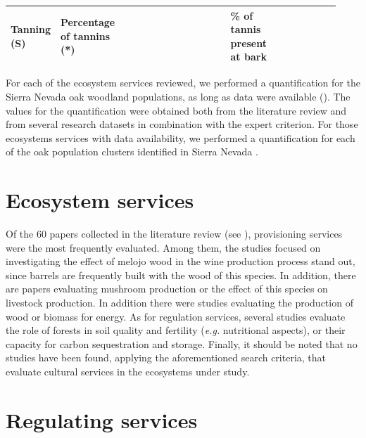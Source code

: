 \begin{table}
\begin{adjustbox}{width=\linewidth}
\begin{threeparttable}
\begin{tabular}{>{\raggedleft}m{0.087\linewidth}m{0.108\linewidth}m{0.4\linewidth}m{0.102\linewidth}m{0.165\linewidth}m{0.071\linewidth}}
Tanning (S) & Percentage of tannins (*) & \autocites{FernandezdeSimonetal2006ChemicalCharacterization,Doceetal2007EffectImmature,TornerOchoa1952CurtientesVegetales} & \% of tannis present at bark &  & \\ \bottomrule
\end{tabular}
\end{threeparttable}
\end{adjustbox}
\end{table}

For each of the ecosystem services reviewed, we performed a quantification for the Sierra Nevada oak woodland populations, as long as data were available (). The values for the quantification were obtained both from the literature review and from several research datasets in combination with the expert criterion. For those ecosystems services with data availability, we performed a quantification for each of the oak population clusters identified in Sierra Nevada \autocite[N: Northern, NW: Northwestern, and S: Southern; see][]{PerezLuqueetal2021EcologicalDiversity}. 

\section{Ecosystem services}\label{sec:es:results}

Of the 60 papers collected in the literature review (see ), provisioning services were the most frequently evaluated. Among them, the studies focused on investigating the effect of melojo wood in the wine production process stand out, since barrels are frequently built with the wood of this species. In addition, there are papers evaluating mushroom production or the effect of this species on livestock production. In addition there were studies evaluating the production of wood or biomass for energy. As for regulation services, several studies evaluate the role of \Qp forests in soil quality and fertility (\emph{e.g.} nutritional aspects), or their capacity for carbon sequestration and storage. Finally, it should be noted that no studies have been found, applying the aforementioned search criteria, that evaluate cultural services in the ecosystems under study.

\section{Regulating services}\label{sec:es:regulation}
